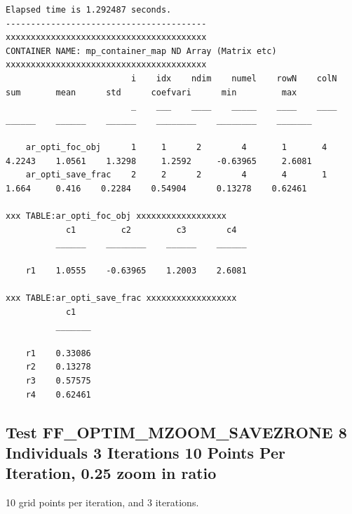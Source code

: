 \documentclass[
]{book}
\begin{document}
\begin{verbatim}
Elapsed time is 1.292487 seconds.
----------------------------------------
xxxxxxxxxxxxxxxxxxxxxxxxxxxxxxxxxxxxxxxx
CONTAINER NAME: mp_container_map ND Array (Matrix etc)
xxxxxxxxxxxxxxxxxxxxxxxxxxxxxxxxxxxxxxxx
                         i    idx    ndim    numel    rowN    colN     sum       mean      std      coefvari      min         max  
                         _    ___    ____    _____    ____    ____    ______    ______    ______    ________    ________    _______

    ar_opti_foc_obj      1     1      2        4       1       4      4.2243    1.0561    1.3298     1.2592     -0.63965     2.6081
    ar_opti_save_frac    2     2      2        4       4       1       1.664     0.416    0.2284    0.54904      0.13278    0.62461

xxx TABLE:ar_opti_foc_obj xxxxxxxxxxxxxxxxxx
            c1         c2         c3        c4  
          ______    ________    ______    ______

    r1    1.0555    -0.63965    1.2003    2.6081

xxx TABLE:ar_opti_save_frac xxxxxxxxxxxxxxxxxx
            c1   
          _______

    r1    0.33086
    r2    0.13278
    r3    0.57575
    r4    0.62461
\end{verbatim}

\hypertarget{test-ff_optim_mzoom_savezrone-8-individuals-3-iterations-10-points-per-iteration-0.25-zoom-in-ratio}{%
\subsection{Test FF\_OPTIM\_MZOOM\_SAVEZRONE 8 Individuals 3 Iterations 10 Points Per Iteration, 0.25 zoom in ratio}\label{test-ff_optim_mzoom_savezrone-8-individuals-3-iterations-10-points-per-iteration-0.25-zoom-in-ratio}}

10 grid points per iteration, and 3 iterations.
\end{document}
